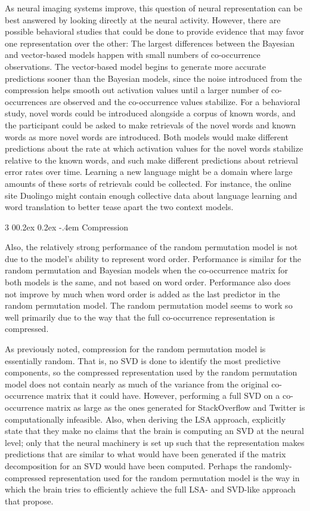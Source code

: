 \documentclass[man,donotrepeattitle]{apa6}
\makeatletter
\renewcommand{\subsubsection}{%
  \@startsection
  {subsubsection}%
  {3}%
  {\parindent}%
  {0\baselineskip \@plus 0.2ex \@minus 0.2ex}%
  {-.4em}%
  {\normalfont\normalsize\bfseries\addperi}}
\makeatother
\begin{document}
As neural imaging systems improve, this question of neural representation can be best answered by looking directly at the neural activity.
However, there are possible behavioral studies that could be done to provide evidence that may favor one representation over the other:
The largest differences between the Bayesian and vector-based models happen with small numbers of co-occurrence observations.
The vector-based model begins to generate more accurate predictions sooner than the Bayesian models,
since the noise introduced from the compression helps smooth out activation values until a larger number of co-occurrences are observed and the co-occurrence values stabilize.
For a behavioral study, novel words could be introduced alongside a corpus of known words, and the participant could be asked to make retrievals of the novel words and known words as more novel words are introduced.
Both models would make different predictions about the rate at which activation values for the novel words stabilize relative to the known words, and such make different predictions about retrieval error rates over time.
Learning a new language might be a domain where large amounts of these sorts of retrievals could be collected.
For instance, the online site Duolingo might contain enough collective data about language learning and word translation to better tease apart the two context models.

\subsubsection{Compression}

Also, the relatively strong performance of the random permutation model is not due to the model's ability to represent word order.
Performance is similar for the random permutation and Bayesian models when the co-occurrence matrix for both models is the same, and not based on word order.
Performance also does not improve by much when word order is added as the last predictor in the random permutation model.
The random permutation model seems to work so well primarily due to the way that the full co-occurrence representation is compressed.

As previously noted, compression for the random permutation model is essentially random.
That is, no SVD is done to identify the most predictive components,
so the compressed representation used by the random permutation model does not contain nearly as much of the variance from the original co-occurrence matrix that it could have.
However, performing a full SVD on a co-occurrence matrix as large as the ones generated for StackOverflow and Twitter is computationally infeasible.
Also, when deriving the LSA approach, \textcite{Landauer1997} explicitly state that they make no claims that the brain is computing an SVD at the neural level;
only that the neural machinery is set up such that the representation makes predictions that are similar to what would have been generated if the matrix decomposition for an SVD would have been computed.
Perhaps the randomly-compressed representation used for the random permutation model is the way in which the brain tries to efficiently achieve the full LSA- and SVD-like approach that \citeauthor{Landauer1997} propose.
\end{document}

